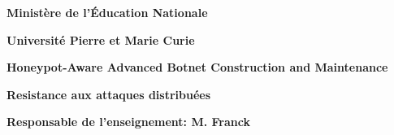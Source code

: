 
\makeatletter
\thispagestyle{empty}

\begin{center}
	\noindent \textbf{Ministère de l'Éducation Nationale}
	\vspace{0.8cm}

	\noindent \textbf{Université Pierre et Marie Curie}

	\vspace{4.0cm}

	\noindent \LARGE{\@title}

	\vspace{1.0cm}

	\noindent \LARGE{\textbf{Honeypot-Aware Advanced Botnet Construction and Maintenance}}

	\vspace{5.0cm}

	\noindent \normalsize{\@author}

	\noindent \textbf{Resistance aux attaques distribuées}

	\vspace{2.5cm}

	\noindent \textbf{Responsable de l'enseignement: M. Franck }

    \vspace{0.7cm}

\end{center}

\makeatother

\pagebreak
\thispagestyle{empty}


